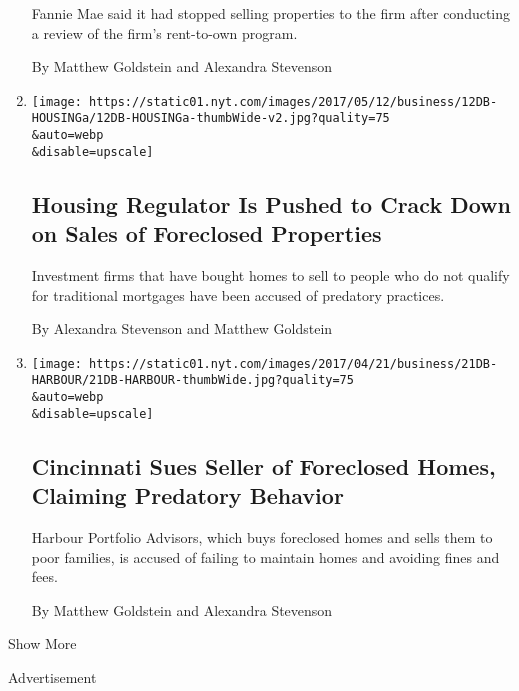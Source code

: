 \begin{enumerate}
  Fannie Mae said it had stopped selling properties to the firm after
  conducting a review of the firm's rent-to-own program.

  By Matthew Goldstein and Alexandra Stevenson
\item
  \href{/2017/05/11/business/dealbook/foreclosed-houses-investment-firms-predatory-practices.html}{}

  \texttt{[image: https://static01.nyt.com/images/2017/05/12/business/12DB-HOUSINGa/12DB-HOUSINGa-thumbWide-v2.jpg?quality=75\\\&auto=webp\\\&disable=upscale]}

  \hypertarget{housing-regulator-is-pushed-to-crack-down-on-sales-of-foreclosed-properties}{%
  \subsection{Housing Regulator Is Pushed to Crack Down on Sales of
  Foreclosed
  Properties}\label{housing-regulator-is-pushed-to-crack-down-on-sales-of-foreclosed-properties}}

  Investment firms that have bought homes to sell to people who do not
  qualify for traditional mortgages have been accused of predatory
  practices.

  By Alexandra Stevenson and Matthew Goldstein
\item
  \href{/2017/04/20/business/dealbook/cincinnati-sues-harbour-seller-foreclosed-homes.html}{}

  \texttt{[image: https://static01.nyt.com/images/2017/04/21/business/21DB-HARBOUR/21DB-HARBOUR-thumbWide.jpg?quality=75\\\&auto=webp\\\&disable=upscale]}

  \hypertarget{cincinnati-sues-seller-of-foreclosed-homes-claiming-predatory-behavior}{%
  \subsection{Cincinnati Sues Seller of Foreclosed Homes, Claiming
  Predatory
  Behavior}\label{cincinnati-sues-seller-of-foreclosed-homes-claiming-predatory-behavior}}

  Harbour Portfolio Advisors, which buys foreclosed homes and sells them
  to poor families, is accused of failing to maintain homes and avoiding
  fines and fees.

  By Matthew Goldstein and Alexandra Stevenson
\end{enumerate}

Show More

Advertisement

